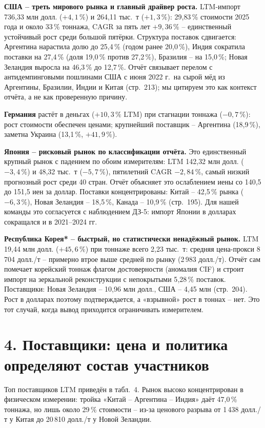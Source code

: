 \documentclass[11pt,a4paper]{article}
\begin{document}
\textbf{США -- треть мирового рынка и главный драйвер роста.} LTM-импорт 736{,}33 млн долл.
($+4{,}1\,\%$) и 264{,}11 тыс.~т ($+1{,}3\,\%$): 29{,}83\,\% стоимости 2025 года и около 33\,\%
тоннажа, CAGR за пять лет $+9{,}36\,\%$ -- единственный устойчивый рост среди большой пятёрки.
Структура поставок сдвигается: Аргентина нарастила долю до 25{,}4\,\% (годом ранее 20{,}0\,\%),
Индия сократила поставки на 27{,}4\,\% (доля 19{,}0\,\% против 27{,}2\,\%), Бразилия -- на
15{,}0\,\%; Новая Зеландия выросла на 46{,}3\,\% до 12{,}7\,\%. Отчёт связывает перелом
с антидемпинговыми пошлинами США с июня 2022 г.\ на сырой мёд из Аргентины, Бразилии, Индии
и Китая (стр.~213); мы цитируем это как контекст отчёта, а не как проверенную причину.

\textbf{Германия} растёт в деньгах ($+10{,}3\,\%$ LTM) при стагнации тоннажа ($-0{,}7\,\%$):
рост стоимости обеспечен ценами; крупнейший поставщик -- Аргентина (18{,}9\,\%), заметна
Украина (13{,}1\,\%, $+41{,}9\,\%$).

\textbf{Япония -- рисковый рынок по классификации отчёта.} Это единственный крупный рынок
с падением по обоим измерителям: LTM 142{,}32 млн долл. ($-3{,}4\,\%$) и 48{,}32 тыс.~т
($-5{,}7\,\%$), пятилетний CAGR $-2{,}84\,\%$, самый низкий прогнозный рост среди 40 стран.
Отчёт объясняет это ослаблением иены со 140{,}5 до 151{,}5 иен за доллар. Поставки
концентрированы: Китай -- 42{,}5\,\% рынка ($-6{,}3\,\%$), Новая Зеландия -- 18{,}5\,\%,
Канада -- 10{,}9\,\% (стр.~195). Для нашей команды это согласуется с наблюдением ДЗ-5:
импорт Японии в долларах сокращался и в 2021--2024 гг.

\textbf{Республика Корея* -- быстрый, но статистически ненадёжный рынок.} LTM 19{,}44 млн
долл. ($+45{,}6\,\%$) при тоннаже всего 2{,}23 тыс.~т: средняя цена-прокси 8\,704 долл./т --
примерно втрое выше средней по рынку (2\,983 долл./т). Отчёт сам помечает корейский тоннаж
флагом достоверности (аномалия CIF) и строит импорт на зеркальной реконструкции с непокрытыми
5{,}28\,\% поставок. Поставщики: Новая Зеландия -- 10{,}96 млн долл., США -- 4{,}45 млн
(стр.~204). Рост в долларах поэтому подтверждается, а «взрывной» рост в тоннах -- нет. Это
тот случай, когда вывод приходится ограничивать измерителем.

\section*{4. Поставщики: цена и политика определяют состав участников}

Топ поставщиков LTM приведён в табл.~4. Рынок высоко концентрирован в физическом измерении:
тройка «Китай -- Аргентина -- Индия» даёт 47{,}0\,\% тоннажа, но лишь около 29\,\% стоимости --
из-за ценового разрыва от 1\,438 долл./т у Китая до 20\,810 долл./т у Новой Зеландии.
\end{document}
